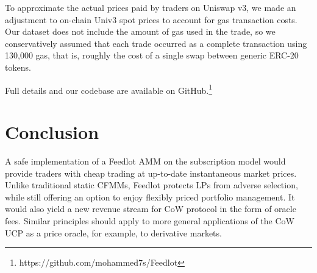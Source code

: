 \documentclass[a4paper,10pt]{article}
\theoremstyle{remark}
\begin{document}
To approximate the actual prices paid by traders on Uniswap v3, we made an adjustment to on-chain Univ3 spot prices to account for gas transaction costs.
%
Our dataset does not include the amount of gas used in the trade, so we conservatively assumed that each trade occurred as a complete transaction using 130,000 gas, that is, roughly the cost of a single swap between generic ERC-20 tokens.


%
%


Full details and our codebase are available on GitHub.\footnote{https://github.com/mohammed7s/Feedlot}

\section{Conclusion}

A safe implementation of a Feedlot AMM on the subscription model would provide traders with cheap trading at up-to-date instantaneous market prices.
%
Unlike traditional static CFMMs, Feedlot protects LPs from adverse selection, while still offering an option to enjoy flexibly priced portfolio management. 
%
It would also yield a new revenue stream for CoW protocol in the form of oracle fees.
%
Similar principles should apply to more general applications of the CoW UCP as a price oracle, for example, to derivative markets.
\end{document}
